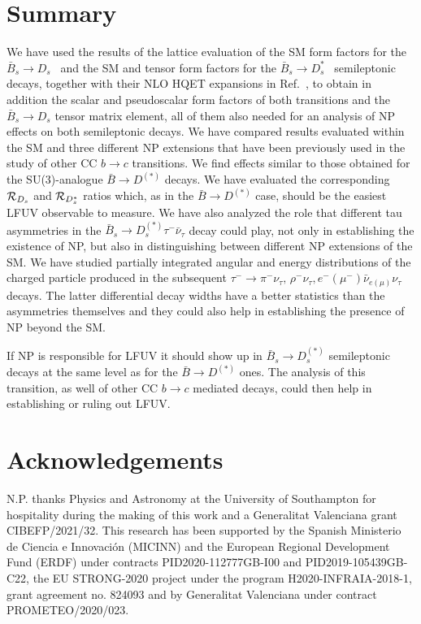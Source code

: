 \documentclass[aps,superscriptaddress,showpacs,nofootinbib,11pt]{revtex4-1}
\begin{document}
\section{Summary}
\label{sec:summary}
We have used the results of the lattice evaluation of the SM form factors for the
$\bar B_s\to D_s$~\cite{McLean:2019qcx}  and the SM and tensor form factors for the $\bar B_s\to D_s^{*}$~\cite{Harrison:2023dzh} semileptonic decays, together with their NLO HQET expansions in Ref.~\cite{Bernlochner:2017jka}, to 
obtain in addition the scalar and pseudoscalar form factors of both transitions and the $\bar B_s\to D_s$ tensor matrix element, all of them  also needed for an analysis of NP effects on both semileptonic decays. We have compared results evaluated 
within the SM and three different NP extensions that have been previously used in the study of other CC $b\to c$ transitions. We find effects similar to those
 obtained for the SU(3)-analogue $\bar B\to D^{(*)}$  decays. We have evaluated the
 corresponding ${\cal R}_{D_s}$ and ${\cal R}_{D_s^{*}}$ ratios which, as in the  $\bar B\to D^{(*)}$ case, should be the easiest LFUV observable to measure. We have also analyzed the role that different tau asymmetries in the $\bar B_s\to D_s^{(*)}\tau^-\bar\nu_\tau$ decay could play, 
 not only in establishing the existence of NP, but also in distinguishing between different NP extensions of the SM. We have studied partially integrated  angular and energy distributions of the charged particle produced in the subsequent $\tau^-
 \to\pi^-\nu_\tau,\,\rho^-\nu_\tau,e^-(\mu^-)\bar\nu_{e(\mu)}\nu_\tau$  decays. The latter differential decay widths have a better statistics than the asymmetries themselves and they could also help in establishing the presence of NP beyond the SM.
 
 If NP is responsible for LFUV  it should  show up in $\bar B_s\to D_s^{(*)}$ semileptonic decays at the same level as for the $\bar B\to D^{(*)}$ ones. The analysis of this transition, as well of other CC $b\to c$ mediated decays, could then help in establishing or ruling out LFUV.
 

\section*{Acknowledgements}
 N.P. thanks Physics and Astronomy  at the University of Southampton for hospitality during the making of this  
  work  and a Generalitat Valenciana grant CIBEFP/2021/32. This research has 
 been supported  by   the Spanish Ministerio de Ciencia e Innovaci\'on (MICINN)
and the European Regional Development Fund (ERDF) under contracts PID2020-112777GB-I00 and 
PID2019-105439GB-C22, the EU STRONG-2020 project under the program H2020-INFRAIA-2018-1, 
grant agreement no. 824093 and by  Generalitat Valenciana under contract PROMETEO/2020/023. 
\end{document}
